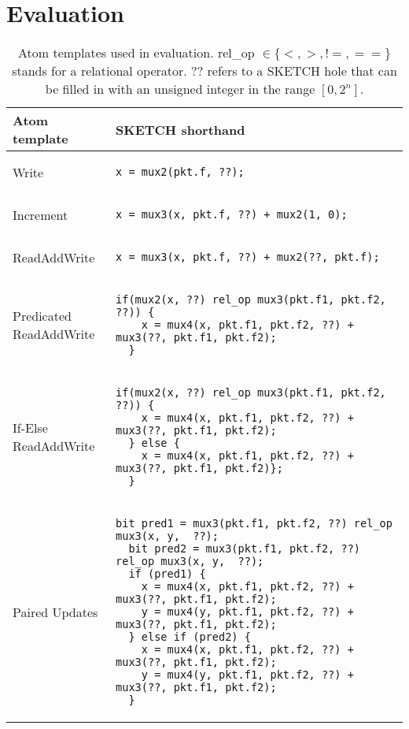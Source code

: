 \section{Evaluation}
\label{s:eval}
\begin{table*}[!t]
  \begin{scriptsize}
  \begin{tabular}{|p{}|p{}|}
  \hline
  Atom template & SKETCH shorthand\\
  \hline
  Write &
  {\begin{lstlisting}[style=customctable]
  x = mux2(pkt.f, ??);
  \end{lstlisting}} \\
  \hline
  Increment &
  {\begin{lstlisting}[style=customctable]
  x = mux3(x, pkt.f, ??) + mux2(1, 0);
  \end{lstlisting}} \\
  \hline
  ReadAddWrite &
  {\begin{lstlisting}[style=customctable]
  x = mux3(x, pkt.f, ??) + mux2(??, pkt.f);
  \end{lstlisting}} \\
  \hline
  \pbox{0.15\textwidth}
  {Predicated\\
  ReadAddWrite} &
  {\begin{lstlisting}[style=customctable]
  if(mux2(x, ??) rel_op mux3(pkt.f1, pkt.f2, ??)) {
    x = mux4(x, pkt.f1, pkt.f2, ??) + mux3(??, pkt.f1, pkt.f2);
  }
  \end{lstlisting}} \\
  \hline
  \pbox{0.15\textwidth}
  {If-Else\\
   ReadAddWrite} &
  {\begin{lstlisting}[style=customctable]
  if(mux2(x, ??) rel_op mux3(pkt.f1, pkt.f2, ??)) {
    x = mux4(x, pkt.f1, pkt.f2, ??) + mux3(??, pkt.f1, pkt.f2);
  } else {
    x = mux4(x, pkt.f1, pkt.f2, ??) + mux3(??, pkt.f1, pkt.f2)};
  }
  \end{lstlisting}} \\
  \hline
  Paired Updates &
  {\begin{lstlisting}[style=customctable]
  bit pred1 = mux3(pkt.f1, pkt.f2, ??) rel_op mux3(x, y,  ??);
  bit pred2 = mux3(pkt.f1, pkt.f2, ??) rel_op mux3(x, y,  ??);
  if (pred1) {
    x = mux4(x, pkt.f1, pkt.f2, ??) + mux3(??, pkt.f1, pkt.f2);
    y = mux4(y, pkt.f1, pkt.f2, ??) + mux3(??, pkt.f1, pkt.f2);
  } else if (pred2) {
    x = mux4(x, pkt.f1, pkt.f2, ??) + mux3(??, pkt.f1, pkt.f2);
    y = mux4(y, pkt.f1, pkt.f2, ??) + mux3(??, pkt.f1, pkt.f2);
  }
  \end{lstlisting}} \\
  \hline
  \end{tabular}
\end{scriptsize}
  \caption{Atom templates used in evaluation. rel\_op $\in \{<, >, != , ==\}$ stands for a relational operator. ?? refers to a SKETCH hole that can be filled in with an unsigned integer in the range $[0, 2^n]$.}
  \label{tab:templates}
\end{table*}

